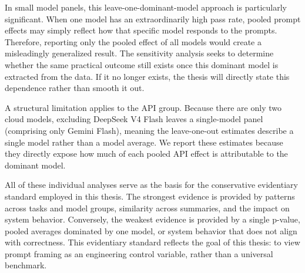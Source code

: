 In small model panels, this leave-one-dominant-model approach is particularly significant. When one model has an extraordinarily high pass rate, pooled prompt effects may simply reflect how that specific model responds to the prompts. Therefore, reporting only the pooled effect of all models would create a misleadingly generalized result. The sensitivity analysis seeks to determine whether the same practical outcome still exists once this dominant model is extracted from the data. If it no longer exists, the thesis will directly state this dependence rather than smooth it out.

A structural limitation applies to the API group. Because there are only two cloud models, excluding DeepSeek V4 Flash leaves a single-model panel (comprising only Gemini Flash), meaning the leave-one-out estimates describe a single model rather than a model average. We report these estimates because they directly expose how much of each pooled API effect is attributable to the dominant model.

All of these individual analyses serve as the basis for the conservative evidentiary standard employed in this thesis. The strongest evidence is provided by patterns across tasks and model groups, similarity across summaries, and the impact on system behavior. Conversely, the weakest evidence is provided by a single p-value, pooled averages dominated by one model, or system behavior that does not align with correctness. This evidentiary standard reflects the goal of this thesis: to view prompt framing as an engineering control variable, rather than a universal benchmark.
